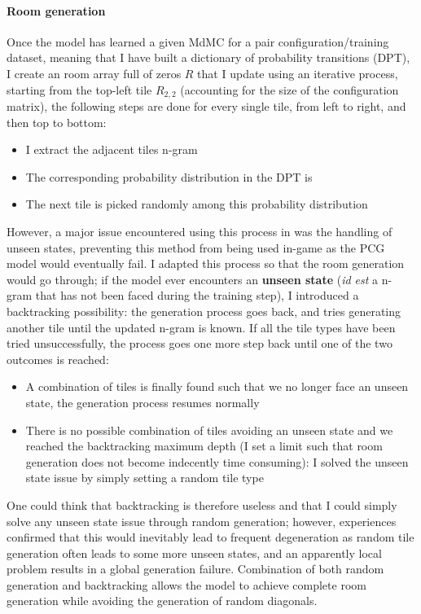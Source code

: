 \documentclass{article}
\begin{document}
\paragraph{Room generation} Once the model has learned a given MdMC for a pair configuration/training dataset, meaning that I have built a dictionary of probability transitions (DPT), I create an room array full of zeros $R$ that I update using an iterative process, starting from the top-left tile $R_{2,2}$ (accounting for the size of the configuration matrix), the following steps are done for every single tile, from left to right, and then top to bottom:
\begin{itemize}
    \item I extract the adjacent tiles n-gram
    \item The corresponding probability distribution in the DPT is 
    \item The next tile is picked randomly among this probability distribution
\end{itemize}
However, a major issue encountered using this process in \cite{MC} was the handling of unseen states, preventing this method from being used in-game as the PCG model would eventually fail. I adapted this process so that the room generation would go through; if the model ever encounters an \textbf{unseen state} (\textit{id est} a n-gram that has not been faced during the training step), I introduced a backtracking possibility: the generation process goes back, and tries generating another tile until the updated n-gram is known. If all the tile types have been tried unsuccessfully, the process goes one more step back until one of the two outcomes is reached:
\begin{itemize}
    \item A combination of tiles is finally found such that we no longer face an unseen state, the generation process resumes normally
    \item There is no possible combination of tiles avoiding an unseen state and we reached the backtracking maximum depth (I set a limit such that room generation does not become indecently time consuming): I solved the unseen state issue by simply setting a random tile type
\end{itemize}
One could think that backtracking is therefore useless and that I could simply solve any unseen state issue through random generation; however, experiences confirmed that this would inevitably lead to frequent degeneration as random tile generation often leads to some more unseen states, and an apparently local problem results in a global generation failure. Combination of both random generation and backtracking allows the model to achieve complete room generation while avoiding the generation of random diagonals.
\end{document}
